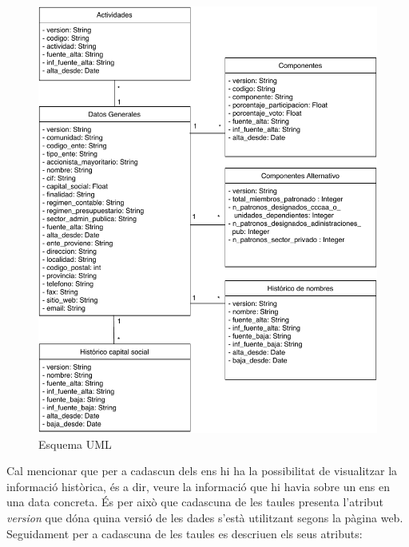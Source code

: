 \documentclass[12pt]{article}
\begin{document}
\begin{figure}[H]
    \centering
    \includegraphics[width=0.7\columnwidth]{img/UML.pdf}
    \caption{Esquema UML} 
    \label{UML}
\end{figure}


Cal mencionar que per a cadascun dels ens hi ha la possibilitat de visualitzar la informació històrica, és a dir, veure la informació que hi havia sobre un ens en una data concreta. És per això que cadascuna de les taules presenta l'atribut \textit{version} que dóna quina versió de les dades s'està utilitzant segons la pàgina web.
Seguidament per a cadascuna de les taules es descriuen els seus atributs:
\end{document}
